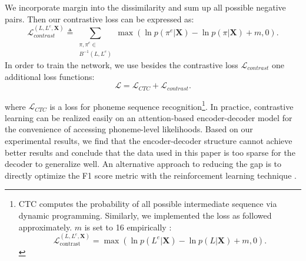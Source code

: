 \documentclass[a4paper]{article}
\begin{document}
We incorporate margin into the dissimilarity and sum up all possible negative pairs. Then our contrastive loss can be expressed as:
\begin{equation}\label{eqn:asr07}
\mathcal{L}_{contrast}^{(L,L^e,\boldsymbol{X})}  \triangleq \sum_{\substack{\pi,\pi^e \in \\ B^{-1}(L,L^e)}} \max(\ln p(\pi^e|\boldsymbol{X}) - \ln p(\pi|\boldsymbol{X}) + m, 0).\nonumber
\end{equation}
In order to train the network, we use besides the contrastive loss $\mathcal{L}_{contrast}$ one additional loss functions:
\begin{equation}\label{eqn:asr08}
\mathcal{L} = \mathcal{L}_{CTC} + \mathcal{L}_{contrast}.
\end{equation}

\noindent where $\mathcal{L}_{CTC}$ is a loss for phoneme sequence recognition\footnote{CTC computes the probability of all possible intermediate sequence via dynamic programming. Similarly, we implemented the loss as followed  approximately. $m$ is set to 16 empirically :
\begin{equation}\label{eqn:asr07}
\mathcal{L}^{(L,L^e,\boldsymbol{X})}_{\mathrm{contrast}} = \max (\ln p(L^e|\boldsymbol{X}) - \ln p(L|\boldsymbol{X}) + m,0).
\end{equation}}. In practice, contrastive learning can be realized easily on an attention-based encoder-decoder model for the convenience of accessing phoneme-level likelihoods. Based on our experimental results, we find that the encoder-decoder structure cannot achieve better results and conclude that the data used in this paper is too sparse for the decoder to generalize well. An alternative approach to reducing the gap is to directly optimize the F1 score metric with the reinforcement learning technique \cite{kaelbling1996reinforcement}.
\end{document}

